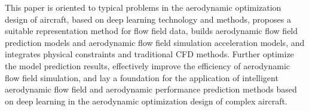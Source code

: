 \begin{eabstract}
This paper is oriented to typical problems in the aerodynamic optimization design of aircraft, based on deep learning technology and methods, proposes a suitable representation method for flow field data, builds aerodynamic flow field prediction models and aerodynamic flow field simulation acceleration models, and integrates physical constraints and traditional CFD methods. Further optimize the model prediction results, effectively improve the efficiency of aerodynamic flow field simulation, and lay a foundation for the application of intelligent aerodynamic flow field and aerodynamic performance prediction methods based on deep learning in the aerodynamic optimization design of complex aircraft.

\end{eabstract}

